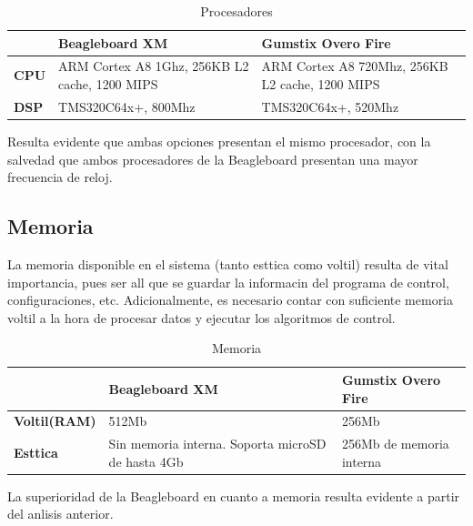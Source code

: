 \documentclass[spanish,12pt,a4paper,titlepage]{report}
\begin{document}
\begin{table}[H]
\begin{tabular}{p{130pt}|p{130pt}|p{130pt}|} 
\cline{2-3}
& \cellcolor[gray]{0.8} \textbf{Beagleboard XM} 
& \cellcolor[gray]{0.8} \textbf{Gumstix Overo Fire} \\ \cline{1-3} \hline
\multicolumn{1}{|p{130pt}|}{\cellcolor[gray]{0.8}\textbf{CPU}} 
&ARM Cortex A8 1Ghz,  256KB L2 cache, 1200 MIPS &ARM Cortex A8 720Mhz, 256KB L2 cache, 1200 MIPS \\ 
\hline 
\multicolumn{1}{|p{130pt}|}{\cellcolor[gray]{0.8}\textbf{DSP}} 
&TMS320C64x+, 800Mhz &TMS320C64x+, 520Mhz\\
\hline
\end{tabular}
\caption{Procesadores}
\label{tab:procesadores}
\end{table}

Resulta evidente que ambas opciones presentan el mismo procesador, con la salvedad que ambos procesadores de la Beagleboard presentan una mayor frecuencia de reloj. 

\subsection*{Memoria}

La memoria disponible en el sistema (tanto esttica como voltil) resulta de vital importancia, pues ser all que se guardar la informacin del programa de control, configuraciones, etc. Adicionalmente, es necesario contar con suficiente memoria voltil a la hora de procesar datos y ejecutar los algoritmos de control.\\

\begin{table}[H]
\begin{tabular}{p{130pt}|p{130pt}|p{130pt}|} 
\cline{2-3}
& \cellcolor[gray]{0.8} \textbf{Beagleboard XM} 
& \cellcolor[gray]{0.8} \textbf{Gumstix Overo Fire} \\ \cline{1-3} \hline
\multicolumn{1}{|p{130pt}|}{\cellcolor[gray]{0.8}\textbf{Voltil(RAM)}} 
&512Mb & 256Mb\\ 
\hline 
\multicolumn{1}{|p{130pt}|}{\cellcolor[gray]{0.8}\textbf{Esttica}} 
&Sin memoria interna.  Soporta microSD de hasta 4Gb  &256Mb de memoria interna\\
\hline
\end{tabular}
\caption{Memoria}
\label{tab:memoria}
\end{table}

La superioridad de la Beagleboard en cuanto a memoria resulta evidente a partir del anlisis anterior.
\end{document}
